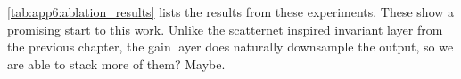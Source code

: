 \begin{figure}[t]
  \centering
  \label{fig:app6:gl_results}
\end{figure}

\autoref{tab:app6:ablation_results} lists the results from these experiments.
These show a promising start to this work. 
Unlike the scatternet inspired invariant layer from the previous chapter, the
gain layer does naturally downsample the output, so we are able to stack more of
them? Maybe.



